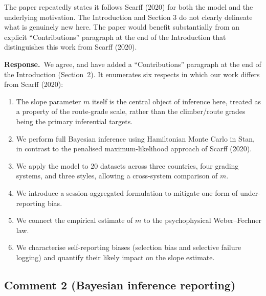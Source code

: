 \documentclass[11pt]{article}
\newenvironment{review}{\begingroup\color{revcolor}\itshape\par\noindent}{\par\endgroup}
\newcommand{\response}{\par\noindent\textbf{Response.}\ }
\begin{document}
\begin{review}
The paper repeatedly states it follows Scarff (2020) for both the model and the underlying motivation. The Introduction and Section 3 do not clearly delineate what is genuinely new here. The paper would benefit substantially from an explicit ``Contributions'' paragraph at the end of the Introduction that distinguishes this work from Scarff (2020).
\end{review}
\response We agree, and have added a ``Contributions'' paragraph at the end of the Introduction (Section~2). It enumerates six respects in which our work differs from Scarff (2020):
\begin{enumerate}[label=(\roman*),leftmargin=2em]
    \item The slope parameter $m$ itself is the central object of inference here, treated as a property of the route-grade scale, rather than the climber/route grades being the primary inferential targets.
    \item We perform full Bayesian inference using Hamiltonian Monte Carlo in Stan, in contrast to the penalised maximum-likelihood approach of Scarff (2020).
    \item We apply the model to 20 datasets across three countries, four grading systems, and three styles, allowing a cross-system comparison of $m$.
    \item We introduce a session-aggregated formulation to mitigate one form of under-reporting bias.
    \item We connect the empirical estimate of $m$ to the psychophysical Weber--Fechner law.
    \item We characterise self-reporting biases (selection bias and selective failure logging) and quantify their likely impact on the slope estimate.
\end{enumerate}

\subsection*{Comment 2 (Bayesian inference reporting)}
\end{document}
